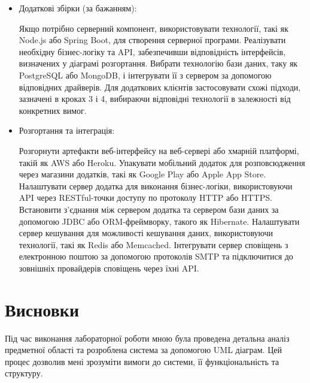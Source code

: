 \documentclass[oneside,14pt]{extarticle}
\begin{document}
\begin{normalsize}
\begin{itemize}
	\item Додаткові збірки (за бажанням):
	
    Якщо потрібно серверний компонент, використовувати технології, такі як Node.js або Spring Boot, для створення серверної програми.
Реалізувати необхідну бізнес-логіку та API, забезпечивши відповідність інтерфейсів, визначених у діаграмі розгортання.
Вибрати технологію бази даних, таку як PostgreSQL або MongoDB, і інтегрувати її з сервером за допомогою відповідних драйверів.
Для додаткових клієнтів застосовувати схожі підходи, зазначені в кроках 3 і 4, вибираючи відповідні технології в залежності від конкретних вимог.
	
	\item 	Розгортання та інтеграція:
	
    Розгорнути артефакти веб-інтерфейсу на веб-сервері або хмарній платформі, такій як AWS або Heroku.
Упакувати мобільний додаток для розповсюдження через магазини додатків, такі як Google Play або Apple App Store.
Налаштувати сервер додатка для виконання бізнес-логіки, використовуючи API через RESTful-точки доступу по протоколу HTTP або HTTPS.
Встановити з'єднання між сервером додатка та сервером бази даних за допомогою JDBC або ORM-фреймворку, такого як Hibernate.
Налаштувати сервер кешування для можливості кешування даних, використовуючи технології, такі як Redis або Memcached.
Інтегрувати сервер сповіщень з електронною поштою за допомогою протоколів SMTP та підключитися до зовнішніх провайдерів сповіщень через їхні API.
	
	\end{itemize}
	

	\section*{Висновки}
	   Під час виконання лабораторної роботи мною була проведена детальна аналіз предметної області та розроблена система за допомогою UML діаграм. Цей процес дозволив мені зрозуміти вимоги до системи, її функціональність та структуру.
\end{normalsize}
\end{document}
